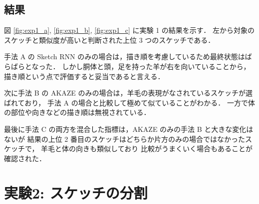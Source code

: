 \documentclass[twocolumn]{jarticle}     %
\begin{document}
\subsection{結果}



図 \ref{fig:exp1_a}, \ref{fig:exp1_b}, \ref{fig:exp1_c} に実験 1 の結果を示す．
左から対象のスケッチと類似度が高いと判断された上位 3 つのスケッチである．

手法 A の Sketch RNN のみの場合は，描き順を考慮しているため最終状態はばらばらとなった．
しかし胴体と頭，足を持った羊が右を向いていることから，描き順という点で評価すると妥当であると言える．

次に手法 B の AKAZE のみの場合は，羊毛の表現がなされているスケッチが選ばれており，
手法 A の場合と比較して極めて似ていることがわかる．
一方で体の部位や向きなどの描き順は無視されている．

最後に手法 C の両方を混合した指標は，AKAZE のみの手法 B と大きな変化はないが
 結果の上位 2 番目のスケッチはどちらか片方のみの場合ではなかったスケッチで，
 羊毛と体の向きも類似しており 比較がうまくいく場合もあることが確認された．


\section{実験2: スケッチの分割}
\end{document}

